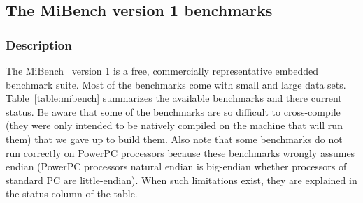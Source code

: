 \cleardoublepage

\subsection{The MiBench version 1 benchmarks}

\subsubsection{Description}
The MiBench~\cite{mibench, mibenchwebsite} version 1 is a free, commercially representative embedded benchmark suite.
Most of the benchmarks come with small and large data sets.
Table~\ref{table:mibench} summarizes the available benchmarks and there current status.
Be aware that some of the benchmarks are so difficult to cross-compile (they were only intended to be natively compiled on the machine that will run them) that we gave up to build them.
Also note that some benchmarks do not run correctly on PowerPC processors because these benchmarks wrongly assumes endian (PowerPC processors natural endian is big-endian whether processors of standard PC are little-endian).
When such limitations exist, they are explained in the status column of the table.

